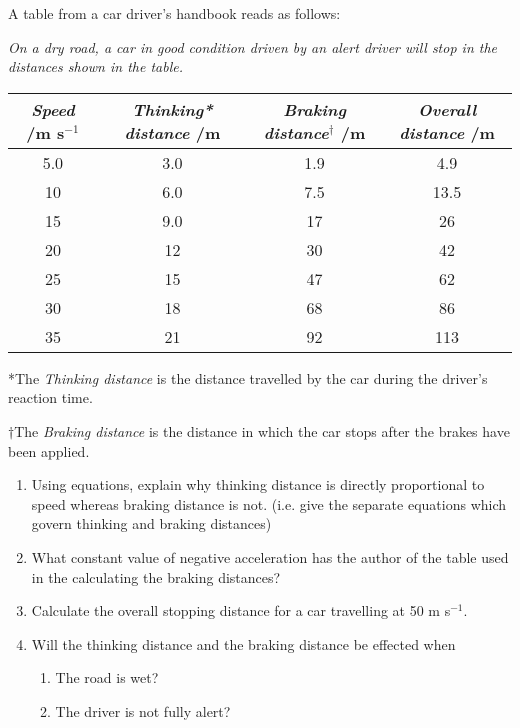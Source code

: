 \begin{problem}[A1989PIIQ9l] %
{A table from a car driver's handbook reads as follows:
  
  \textit{On a dry road, a car in good condition driven by an alert driver will stop in the distances shown in the table.}
  \begin{table}[h]	 %
	\begin{center} 		%
	\begin{tabular}{|c|c|c|c|}	%
	\hline
	\textit{Speed} /m s$^{-1}$ & \textit{Thinking* distance} /m & \textit{Braking distance$^{\dagger}$} /m & \textit{Overall distance} /m \\
	\hline
	5.0 & 3.0 & 1.9 & 4.9\\
	10 & 6.0 & 7.5 & 13.5 \\
	15 & 9.0 & 17 & 26 \\
	20 & 12 & 30 & 42 \\
	25 & 15 & 47 & 62 \\
	30 & 18 & 68 & 86 \\
	35 & 21 & 92 & 113 \\
	\hline
	\end{tabular}
	\end{center}
	\label{table:sintering}
  \end{table}
  
  *The \textit{Thinking distance} is the distance travelled by the car during the driver's reaction time.
  
  $\dagger$The \textit{Braking distance} is the distance in which the car stops after the brakes have been applied.
  
  \begin{enumerate}
  	\item Using equations, explain why thinking distance is directly proportional to speed whereas braking distance is not. (i.e. give the separate equations which govern thinking and braking distances) %
	\item What constant value of negative acceleration has the author of the table used in the calculating the braking distances?
	\item Calculate the overall stopping distance for a car travelling at 50 m s$^{-1}$.
	\item Will the thinking distance and the braking distance be effected when
	\begin{enumerate} %
		\item The road is wet?
		\item The driver is not fully alert?
	\end{enumerate}
	

\end{enumerate}}
\end{problem}
